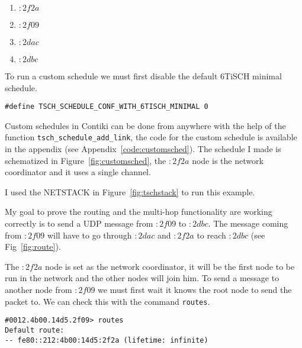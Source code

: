 \begin{enumerate}
  \item $:2f2a$
  \item $:2f09$
  \item $:2dac$
  \item $:2dbc$
\end{enumerate}

To run a custom schedule we must first disable the default 6TiSCH minimal schedule.

\begin{lstlisting}
#define TSCH_SCHEDULE_CONF_WITH_6TISCH_MINIMAL 0
\end{lstlisting}

Custom schedules in Contiki can be done from anywhere with the help of the
function \lstinline{tsch_schedule_add_link}, the code for the custom schedule
is available in the appendix (see Appendix~\ref{code:customsched}).
The schedule I made is schematized in Figure~\ref{fig:customsched}, the $:2f2a$ 
node is the network coordinator and it uses a single channel.



I used the NETSTACK in Figure~\ref{fig:tschstack} to run this example.



My goal to prove the routing and the multi-hop functionality are working
correctly is to send a UDP message from $:2f09$ to $:2dbc$.
The message coming from $:2f09$ will have to go through $:2dac$ and $:2f2a$ to
reach $:2dbc$ (see Fig~\ref{fig:route}).





The $:2f2a$ node is set as the network coordinator, it will be the first node to be
run in the network and the other nodes will join him.
To send a message to another node from $:2f09$ we must first wait it 
knows the root node to send the packet to.
We can check this with the command \lstinline{routes}.

\begin{lstlisting}[language=none]
#0012.4b00.14d5.2f09> routes
Default route:
-- fe80::212:4b00:14d5:2f2a (lifetime: infinite)
\end{lstlisting}

